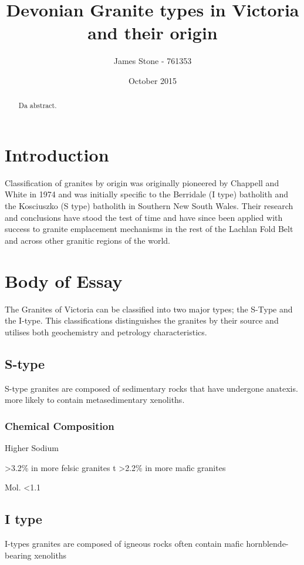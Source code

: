 \documentclass[a4paper]{article}
\title{Devonian Granite types in Victoria and their origin}
\author{James Stone - 761353}
\date{October 2015}
\begin{document}
\maketitle
\newpage

\begin{abstract}
Da abstract.
\end{abstract}

\section{Introduction}

Classification of granites by origin was originally pioneered by Chappell and White in 1974 and was initially specific to the Berridale (I type) batholith and the Kosciuszko (S type) batholith in Southern New South Wales. Their research and conclusions have stood the test of time and have since been applied with success to granite emplacement mechanisms in the rest of the Lachlan Fold Belt and across other granitic regions of the world.

\section{Body of Essay}
The Granites of Victoria can be classified into two major types; the S-Type and the I-type. \cite{BWChappell}
This classifications distinguishes the granites by their source and utilises both geochemistry and petrology characteristics. 
\label{sec:Body of Essay}

\subsection{S-type}
S-type granites are composed of sedimentary rocks that have undergone anatexis.
more likely to contain metasedimentary xenoliths.

\subsubsection{Chemical Composition}
Higher Sodium

 \textgreater 3.2\% in more felsic granites
t
 \textgreater 2.2\% in more mafic granites

Mol.  \textless 1.1

\subsection{I type}
I-types granites are composed of igneous rocks
often contain mafic hornblende-bearing xenoliths
\end{document}
